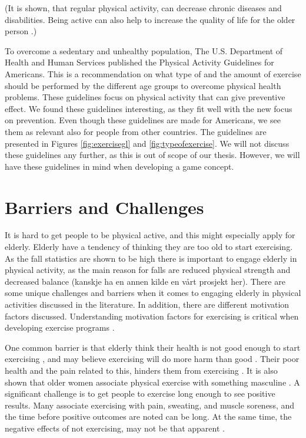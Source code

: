 (It is shown, that regular physical activity, can decrease chronic diseases and disabilities. Being active can also help to increase the quality of life for the older person \cite{schutzer}.)
 
To overcome a sedentary and unhealthy population, The U.S. Department of Health and Human Services published the Physical Activity Guidelines for 
Americans. This is a recommendation on what type of and the amount of exercise should be performed by the different age groups to overcome physical health problems. These guidelines focus on physical activity that can give preventive effect. We found these guidelines interesting, as they fit well with the new focus on prevention. Even though these guidelines are made for Americans, we see them as relevant also for people from other countries. The guidelines are presented in Figures \ref{fig:exercisegl} and \ref{fig:typeofexercise}. We will not discuss these guidelines any further, as this is out of scope of our thesis. However, we will have these guidelines in mind when developing a game concept.

\section{Barriers and Challenges}
It is hard to get people to be physical active, and this might especially apply for elderly. Elderly have a tendency of thinking they are too old to start exercising. As the fall statistics are shown to be high there is important to engage elderly in physical activity, as the main reason for falls are reduced physical strength and decreased balance \cite{project} (kanskje ha en annen kilde en vårt prosjekt her). There are some unique challenges and barriers when it comes to engaging elderly in physical activities discussed in the literature. In addition, there are different motivation factors discussed. Understanding motivation factors for exercising is critical when developing exercise programs \cite{chao}.

One common barrier is that elderly think their health is not good enough to start exercising \cite{schutzer}, and may believe exercising will do more harm than good \cite{chao}. Their poor health and the pain related to this, hinders them from exercising \cite{schutzer}. It is also shown that older women associate physical exercise with something masculine \cite{chao}. A significant challenge is to get people to exercise long enough to see positive results. Many associate exercising with pain, sweating, and muscle soreness, and the time before positive outcomes are noted can be long. At the same time, the negative effects of not exercising, may not be that apparent \cite{chao}. 


